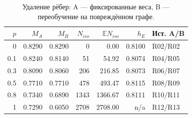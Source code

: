 \begin{table}[H]\centering\footnotesize
\setlength{\tabcolsep}{4pt}
\caption{Удаление рёбер: A --- фиксированные веса, B --- переобучение на повреждённом графе.}\label{tab:deletion}
\begin{tabular}{rrrrrrl}
\toprule
$p$ & $M_A$ & $M_B$ & $N_{iso}$ & $\mathbb E N_{iso}$ & $h_E$ & Ист. A/B \\
\midrule
0 & 0.8290 & 0.8290 & 0 & 0.00 & 0.8100 & R02/R02 \\
0.1 & 0.8240 & 0.8140 & 51 & 54.92 & 0.8074 & R04/R05 \\
0.3 & 0.8090 & 0.8060 & 206 & 216.85 & 0.8073 & R06/R07 \\
0.5 & 0.7710 & 0.7710 & 478 & 493.47 & 0.8115 & R08/R09 \\
0.8 & 0.7340 & 0.6890 & 1343 & 1366.67 & 0.8111 & R10/R11 \\
1 & 0.7290 & 0.6050 & 2708 & 2708.00 & n/a & R12/R13 \\
\bottomrule
\end{tabular}
\end{table}
